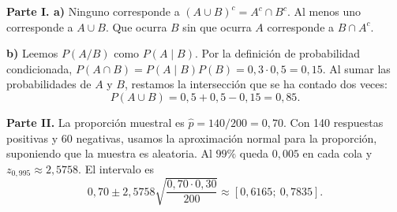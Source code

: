 \textbf{Parte I. a)} Ninguno corresponde a $(A\cup B)^c=A^c\cap B^c$. Al menos uno corresponde a $A\cup B$. Que ocurra $B$ sin que ocurra $A$ corresponde a $B\cap A^c$.

\textbf{b)} Leemos $P(A/B)$ como $P(A\mid B)$. Por la definición de probabilidad condicionada, $P(A\cap B)=P(A\mid B)P(B)=0{,}3\cdot0{,}5=0{,}15$. Al sumar las probabilidades de $A$ y $B$, restamos la intersección que se ha contado dos veces:
\[
 P(A\cup B)=0{,}5+0{,}5-0{,}15=\boxed{0{,}85}.
\]

\textbf{Parte II.} La proporción muestral es $\hat p=140/200=0{,}70$. Con 140 respuestas positivas y 60 negativas, usamos la aproximación normal para la proporción, suponiendo que la muestra es aleatoria. Al $99\%$ queda $0{,}005$ en cada cola y $z_{0{,}995}\approx2{,}5758$. El intervalo es
\[
 0{,}70\pm2{,}5758\sqrt{\frac{0{,}70\cdot0{,}30}{200}}
 \approx\boxed{[0{,}6165;\ 0{,}7835]}.
\]
